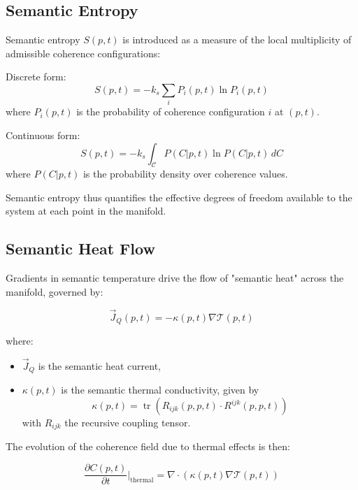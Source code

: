 \subsection{Semantic Entropy}

Semantic entropy \(S(p,t)\) is introduced as a measure of the local multiplicity of admissible coherence configurations:

Discrete form:
\begin{equation}
S(p,t) = -k_s \sum_i P_i(p,t) \ln P_i(p,t)
\end{equation}
where \(P_i(p,t)\) is the probability of coherence configuration \(i\) at \((p,t)\).

Continuous form:
\begin{equation}
S(p,t) = -k_s \int_{\mathcal{C}} P(C|p,t) \ln P(C|p,t) \, dC
\end{equation}
where \(P(C|p,t)\) is the probability density over coherence values.

Semantic entropy thus quantifies the effective degrees of freedom available to the system at each point in the manifold.

\subsection{Semantic Heat Flow}

Gradients in semantic temperature drive the flow of "semantic heat" across the manifold, governed by:

\begin{equation}
\vec{J}_Q(p,t) = -\kappa(p,t) \nabla \mathcal{T}(p,t)
\end{equation}

where:
\begin{itemize}
    \item \(\vec{J}_Q\) is the semantic heat current,
    \item \(\kappa(p,t)\) is the semantic thermal conductivity, given by
    \begin{equation}
    \kappa(p,t) = \operatorname{tr}\left(R_{ijk}(p,p,t) \cdot R^{ijk}(p,p,t)\right)
    \end{equation}
    with \(R_{ijk}\) the recursive coupling tensor.
\end{itemize}

The evolution of the coherence field due to thermal effects is then:

\begin{equation}
\frac{\partial C(p,t)}{\partial t}\bigg|_{\text{thermal}} = \nabla \cdot \left(\kappa(p,t) \nabla \mathcal{T}(p,t)\right)
\end{equation}

